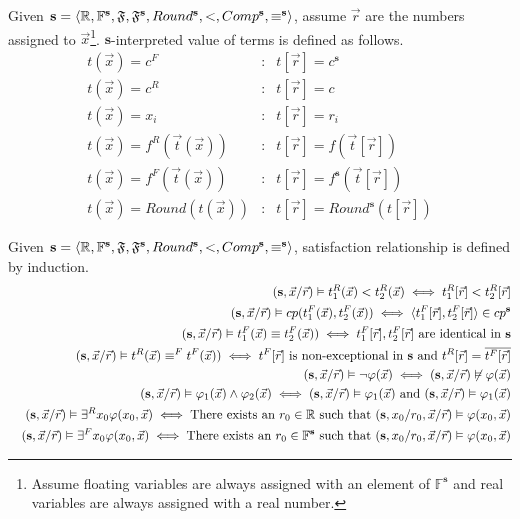 \documentclass[12pt]{article}
\newcommand{\F}{\mathbb{F}}
\newcommand{\s}{\mathbf{s}}
\newcommand{\OL}{\overline}
\begin{document}
\begin{definition}
Given $\s = \langle \R, \F^\s, \mathfrak{F}, \mathfrak{F}^\s, Round^\s, <, Comp^\s, \equiv^\s \rangle$, assume $\vec{r}$ are the numbers assigned to $\vec x$\footnote{Assume floating variables are always assigned with an element of $\F^\s$ and real variables are always assigned with a real number.}. $\s$-interpreted value of terms is defined as follows.
\begin{eqnarray*}
t(\vec x) = c^F &:& t[\vec r] = c ^ \s \\
t(\vec x) = c^R &:& t[\vec r] = c \\
t(\vec x) = x_i &:& t[\vec r] = r_i \\
t(\vec x) = f^R(\vec t(\vec x)) &:& t[\vec r] = f(\vec t[\vec r]) \\
t(\vec x) = f^F(\vec t(\vec x)) &:& t[\vec r] = f^\s(\vec t[\vec r]) \\
t(\vec x) = Round(t(\vec x)) &:& t[\vec r] = Round^\s(t[\vec r])
\end{eqnarray*}
\end{definition}

\begin{definition}
Given $\s = \langle \R, \F^\s, \mathfrak{F}, \mathfrak{F}^\s, Round^\s, <, Comp^\s, \equiv^\s \rangle$, satisfaction relationship is defined by induction.
\begin{eqnarray*}
&&(\s, \vec{x}/\vec{r}) \vDash t^R_1(\vec{x}) < t^R_2(\vec{x}) \iff t^R_1[\vec{r}] < t^R_2[\vec{r}] \\
&&(\s, \vec{x}/\vec{r}) \vDash cp(t^F_1(\vec{x}), t^F_2(\vec{x})) \iff \langle t^F_1[\vec{r}], t^F_2[\vec{r}]\rangle \in cp^\s \\
&&(\s, \vec{x}/\vec{r}) \vDash t^F_1(\vec{x}) \equiv t^F_2(\vec{x})) \iff t^F_1[\vec{r}], t^F_2[\vec{r}] \text{ are identical in } \s\\
&&(\s, \vec{x}/\vec{r}) \vDash t^R(\vec{x}) \equiv^F t^F(\vec{x})) \iff t^F[\vec{r}] \text{ is non-exceptional in } \s \text{ and } t^R[\vec{r}] = \OL{t^F[\vec{r}]}\\
&&(\s, \vec{x}/\vec{r}) \vDash \neg\varphi(\vec{x}) \iff (\s, \vec{x}/\vec{r}) \not\vDash \varphi(\vec{x}) \\
&&(\s, \vec{x}/\vec{r}) \vDash \varphi_1(\vec{x})\wedge\varphi_2(\vec{x}) \iff (\s, \vec{x}/\vec{r}) \vDash \varphi_1(\vec{x}) \text{ and } (\s, \vec{x}/\vec{r}) \vDash \varphi_1(\vec{x}) \\
&&(\s, \vec{x}/\vec{r}) \vDash \exists^R x_0 \varphi(x_0, \vec{x}) \iff \text{There exists an } r_0\in\R \text{ such that }(\s, x_0/r_0, \vec{x}/\vec{r}) \vDash \varphi(x_0, \vec{x})\\
&&(\s, \vec{x}/\vec{r}) \vDash \exists^F x_0 \varphi(x_0, \vec{x}) \iff \text{There exists an } r_0\in\F^\s \text{ such that }(\s, x_0/r_0, \vec{x}/\vec{r}) \vDash \varphi(x_0, \vec{x})
\end{eqnarray*}
\end{definition}
\end{document}
